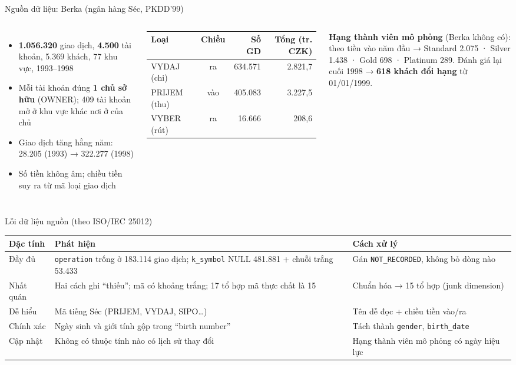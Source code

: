 \documentclass[aspectratio=169,11pt]{beamer}
\newcommand{\tbl}[1]{\texttt{#1}}
\begin{document}
\begin{frame}{Nguồn dữ liệu: Berka (ngân hàng Séc, PKDD'99)}
  \begin{columns}[T]
    \small
    \begin{itemize}
      \item \textbf{1.056.320} giao dịch, \textbf{4.500} tài khoản, 5.369 khách, 77 khu vực, 1993--1998
      \item Mỗi tài khoản đúng \textbf{1 chủ sở hữu} (OWNER); 409 tài khoản mở ở khu vực khác nơi ở của chủ
      \item Giao dịch tăng hằng năm: 28.205 (1993) → 322.277 (1998)
      \item Số tiền không âm; chiều tiền suy ra từ mã loại giao dịch
    \end{itemize}
    \footnotesize
    \setlength{\tabcolsep}{3pt}
    \begin{tabular}{l c r r}
      \toprule
      \textbf{Loại} & \textbf{Chiều} & \textbf{Số GD} & \textbf{Tổng (tr. CZK)} \\
      \midrule
      VYDAJ (chi) & ra & 634.571 & 2.821,7 \\
      PRIJEM (thu) & vào & 405.083 & 3.227,5 \\
      VYBER (rút) & ra & 16.666 & 208,6 \\
      \bottomrule
    \end{tabular}
    \medskip

    \textbf{Hạng thành viên mô phỏng} (Berka không có):\\
    theo tiền vào năm đầu → Standard 2.075 · Silver 1.438 · Gold 698 · Platinum 289.
    Đánh giá lại cuối 1998 → \textbf{618 khách đổi hạng} từ 01/01/1999.
  \end{columns}
\end{frame}

\begin{frame}{Lỗi dữ liệu nguồn (theo ISO/IEC 25012)}
  \footnotesize
  \begin{tabular}{L{1.9cm} L{6.2cm} L{4.6cm}}
    \toprule
    \textbf{Đặc tính} & \textbf{Phát hiện} & \textbf{Cách xử lý} \\
    \midrule
    Đầy đủ & \tbl{operation} trống ở 183.114 giao dịch; \tbl{k\_symbol} NULL 481.881 + chuỗi trắng 53.433 & Gán \tbl{NOT\_RECORDED}, không bỏ dòng nào \\
    Nhất quán & Hai cách ghi ``thiếu''; mã có khoảng trắng; 17 tổ hợp mã thực chất là 15 & Chuẩn hóa → 15 tổ hợp (junk dimension) \\
    Dễ hiểu & Mã tiếng Séc (PRIJEM, VYDAJ, SIPO…) & Tên dễ đọc + chiều tiền vào/ra \\
    Chính xác & Ngày sinh và giới tính gộp trong ``birth number'' & Tách thành \tbl{gender}, \tbl{birth\_date} \\
    Cập nhật & Không có thuộc tính nào có lịch sử thay đổi & Hạng thành viên mô phỏng có ngày hiệu lực \\
    \bottomrule
  \end{tabular}
\end{frame}
\end{document}
